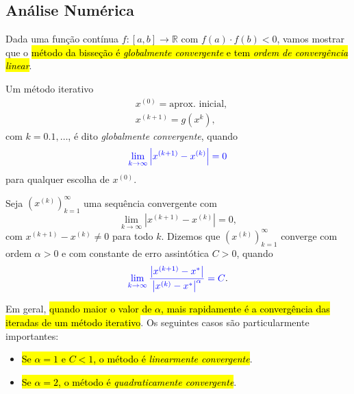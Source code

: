 \subsection{Análise Numérica}

Dada uma função contínua $f:[a, b]\to\mathbb{R}$ com $f(a)\cdot f(b) < 0$, vamos mostrar que o \hl{método da bisseção é \emph{globalmente convergente} e tem \emph{ordem de convergência linear}}.

\begin{defn}
  Um método iterativo
  \begin{align}
    & x^{(0)} = \text{aprox. inicial},\\
    & x^{(k+1)} = g\left(x^{k}\right),
  \end{align}
  com $k = 0.1,\ldots$, é dito \emph{globalmente convergente}, quando
  \begin{equation}
    {\color{blue}\lim_{k\to\infty}\left|x^{(k+1)}-x^{(k)}\right| = 0}
  \end{equation}
  para qualquer escolha de $x^{(0)}$.
\end{defn}

\begin{defn}
  Seja $\left(x^{(k)}\right)_{k=1}^\infty$ uma sequência convergente com
  \begin{equation}
    \lim_{k\to\infty} \left|x^{(k+1)}-x^{(k)}\right| = 0,
  \end{equation}
  com $x^{(k+1)}-x^{(k)}\neq 0$ para todo $k$. Dizemos que $\left(x^{(k)}\right)_{k=1}^\infty$ converge com ordem $\alpha>0$ e com constante de erro assintótica $C>0$, quando
  \begin{equation}
    {\color{blue}\lim_{k\to\infty}\frac{\left|x^{(k+1)}-x^*\right|}{\left|x^{(k)}-x^*\right|^\alpha} = C}. 
  \end{equation}
\end{defn}

Em geral, \hl{quando maior o valor de $\alpha$, mais rapidamente é a convergência das iteradas de um método iterativo}. Os seguintes casos são particularmente importantes:
\begin{itemize}
\item \hl{Se $\alpha = 1$ e $C < 1$, o método é \emph{linearmente convergente}}.
\item \hl{Se $\alpha = 2$, o método é \emph{quadraticamente convergente}}.
\end{itemize}

